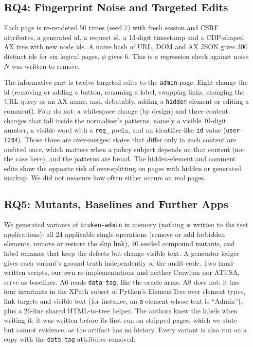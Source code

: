 \subsection{RQ4: Fingerprint Noise and Targeted Edits}
\label{sec:fp}

Each page is re-rendered 50 times (seed 7) with fresh session and CSRF attributes,
a generated id, a request id, a 13-digit timestamp and a CDP-shaped AX tree with new
node ids. A naive hash of URL, DOM and AX JSON gives 300 distinct ids for six
logical pages, $\phi$ gives 6. This is a regression check against noise $N$ was written to remove.

The informative part is twelve targeted edits to the \texttt{admin} page. Eight
change the id (removing or adding a button, renaming a label, swapping links,
changing the URL query or an AX name, and, debatably, adding a \texttt{hidden}
element or editing a comment). Four do not: a whitespace change (by design) and three content
changes that fall inside the normaliser's patterns, namely a visible 10-digit
number, a visible word with a \texttt{req\_} prefix, and an identifier-like
\texttt{id} value (\texttt{user-1234}). Those three are over-merges: states that
differ only in such content are audited once, which matters when a policy subject
depends on that content (not the case here), and the patterns are broad. The
hidden-element and comment edits show the opposite risk of over-splitting on pages
with hidden or generated markup. We did not measure how often either occurs on
real pages.


\subsection{RQ5: Mutants, Baselines and Further Apps}
\label{sec:rq5}

We generated variants of \texttt{broken-admin} in memory (nothing is written to
the test applications): all 24 applicable single operations (remove or add
forbidden elements, remove or restore the skip link), 40 seeded compound mutants,
and label renames that keep the defects but change visible text. A generator
ledger gives each variant's ground truth independently of the audit code. Two
hand-written scripts, our own re-implementations and neither Crawljax nor ATUSA,
serve as baselines. A6 reads \texttt{data-tag}, like the oracle arms. A8 does not:
it has four invariants in the XPath subset of Python's ElementTree over element
types, link targets and visible text (for instance, an \texttt{a} element whose
text is ``Admin''), plus a 26-line shared HTML-to-tree helper. The authors knew the
labels when writing it; it was written before its first run on stripped pages,
which we state but cannot evidence, as the artifact has no history. Every variant
is also run on a copy with the \texttt{data-tag} attributes removed.

